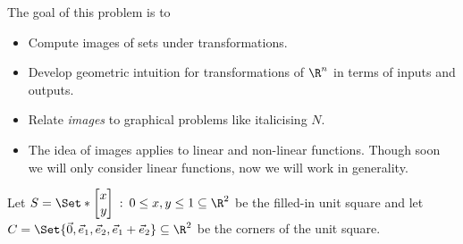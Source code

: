 \documentclass{problemset}
\newcommand{\xhat}{{\vec e_1}}
\newcommand{\yhat}{{\vec e_2}}
\newcommand{\mat}[1]{\begin{bmatrix*}[r]#1\end{bmatrix*}}
\providecommand\given{}
\newcommand\SetSymbol[1][]{%
	\nonscript\::%
	\allowbreak
	\nonscript\:
	\mathopen{}}
\renewcommand\given{\SetSymbol[\delimsize]}
\begin{document}
	\question
	\begin{annotation}
		\begin{goals}

			The goal of this problem is to
			\begin{itemize}
				\item Compute images of sets under transformations.
				\item Develop geometric intuition for transformations of $\R^n$
					in terms of inputs and outputs.
				\item Relate \emph{images} to graphical problems like italicising $N$.
			\end{itemize}
		\end{goals}

		\begin{notes}
			\begin{itemize}
				\item The idea of images applies to linear and non-linear functions.
					Though soon we will only consider linear functions, now
					we will work in generality.
			\end{itemize}
		\end{notes}
	\end{annotation}
	Let $S=\Set*{\mat{x\\y} \given 0\leq x,y\leq 1}\subseteq \R^2$ be the filled-in unit
	square and let $C=\Set{\vec 0, \xhat,\yhat,\xhat+\yhat}\subseteq \R^2$
	be the corners of the unit square.
\end{document}
